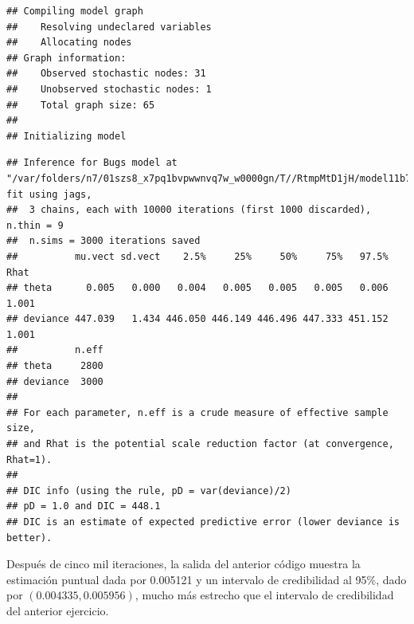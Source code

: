 \begin{Eje}
\begin{knitrout}
\begin{kframe}
\begin{alltt}
 \hlkwb{<-} \hlstd{(}\hlstd{,} \hlstd{)}
 \hlkwb{<-} \hlstd{(}\hlstd{)}
 \hlkwb{<-} \hlstd{()\{}
\hlstd{(}\hlstd{=}\hlstd{)}
\hlstd{\}}
 \hlkwb{<-} \hlstd{(}  \hlstd{=}\hlstd{,} \hlstd{=}\hlstd{,} 
\end{alltt}
\begin{verbatim}
## Compiling model graph
##    Resolving undeclared variables
##    Allocating nodes
## Graph information:
##    Observed stochastic nodes: 31
##    Unobserved stochastic nodes: 1
##    Total graph size: 65
## 
## Initializing model
\end{verbatim}
\begin{alltt}
\end{alltt}
\begin{verbatim}
## Inference for Bugs model at "/var/folders/n7/01szs8_x7pq1bvpwwnvq7w_w0000gn/T//RtmpMtD1jH/model11b7162e6abe.txt", fit using jags,
##  3 chains, each with 10000 iterations (first 1000 discarded), n.thin = 9
##  n.sims = 3000 iterations saved
##          mu.vect sd.vect    2.5%     25%     50%     75%   97.5%  Rhat
## theta      0.005   0.000   0.004   0.005   0.005   0.005   0.006 1.001
## deviance 447.039   1.434 446.050 446.149 446.496 447.333 451.152 1.001
##          n.eff
## theta     2800
## deviance  3000
## 
## For each parameter, n.eff is a crude measure of effective sample size,
## and Rhat is the potential scale reduction factor (at convergence, Rhat=1).
## 
## DIC info (using the rule, pD = var(deviance)/2)
## pD = 1.0 and DIC = 448.1
## DIC is an estimate of expected predictive error (lower deviance is better).
\end{verbatim}
\end{kframe}
\end{knitrout}
    
    Despu\'es de cinco mil iteraciones, la salida del anterior c\'odigo muestra la estimaci\'on puntual dada por 0.005121 y un intervalo de credibilidad al 95\%, dado por $(0.004335, 0.005956)$, mucho m\'as estrecho que el intervalo de credibilidad del anterior ejercicio.
    \end{Eje}
    
